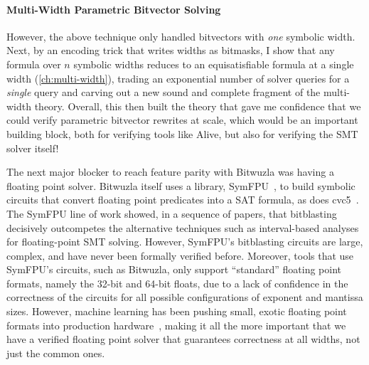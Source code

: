 \paragraph{Multi-Width Parametric Bitvector Solving}
However, the above technique only handled bitvectors with \emph{one} symbolic width.
Next, by an encoding trick that writes widths as bitmasks,
I show that any formula over $n$ symbolic widths reduces to an equisatisfiable formula at a single width (\cref{ch:multi-width}),
trading an exponential number of solver queries for a \emph{single} query and carving out a new sound and complete fragment of the multi-width theory.
Overall, this then built the theory that gave me confidence that we could verify parametric bitvector rewrites at scale,
which would be an important building block, both for verifying tools like Alive, but also for verifying the SMT solver itself!

The next major blocker to reach feature parity with Bitwuzla was having a floating point solver. 
Bitwuzla itself uses a library, SymFPU~\citep{symfpu}, to build symbolic circuits that convert floating point predicates into a SAT formula, as does cvc5~\citep{barbosa2022cvc5}.
The SymFPU line of work showed, in a sequence of papers, that bitblasting decisively outcompetes the alternative
techniques such as interval-based analyses for floating-point SMT solving.
However, SymFPU's bitblasting circuits are large, complex, and have never been formally verified before.
Moreover, tools that use SymFPU's circuits, such as Bitwuzla, only support ``standard'' floating point formats, namely the 32-bit and 64-bit floats,
due to a lack of confidence in the correctness of the circuits for all possible configurations of exponent and mantissa sizes.
However, machine learning has been pushing small, exotic floating point formats into production hardware~\citep{fp8fordl,flops},
making it all the more important that we have a verified floating point solver that guarantees correctness at all widths, not just the common ones.


